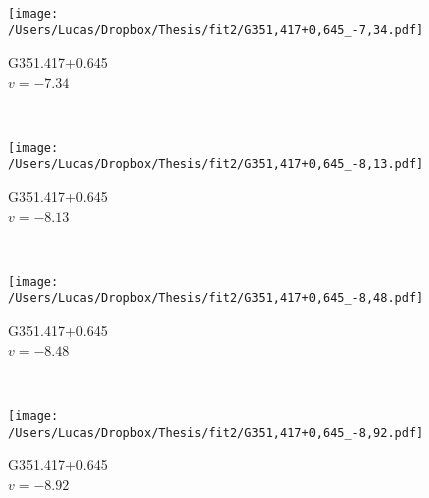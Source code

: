 \begin{figure*}[t]
\begin{subfigure}[t]{0.3\textwidth}
	\end{subfigure}
	~
	\begin{subfigure}[t]{0.3\textwidth}
		\texttt{[image: /Users/Lucas/Dropbox/Thesis/fit2/G351,417+0,645\_-7,34.pdf]}
		\caption[]{G351.417+0.645\\$v=-7.34$\,\kms}
	\end{subfigure}
	~
	\begin{subfigure}[t]{0.3\textwidth}
		\texttt{[image: /Users/Lucas/Dropbox/Thesis/fit2/G351,417+0,645\_-8,13.pdf]}
		\caption[]{G351.417+0.645\\$v=-8.13$\,\kms}
	\end{subfigure}
	~
	\begin{subfigure}[t]{0.3\textwidth}
		\texttt{[image: /Users/Lucas/Dropbox/Thesis/fit2/G351,417+0,645\_-8,48.pdf]}
		\caption[]{G351.417+0.645\\$v=-8.48$\,\kms}
	\end{subfigure}
	~
	\begin{subfigure}[t]{0.3\textwidth}
		\texttt{[image: /Users/Lucas/Dropbox/Thesis/fit2/G351,417+0,645\_-8,92.pdf]}
		\caption[]{G351.417+0.645\\$v=-8.92$\,\kms}
	\end{subfigure}
	~
\end{figure*}
\clearpage
